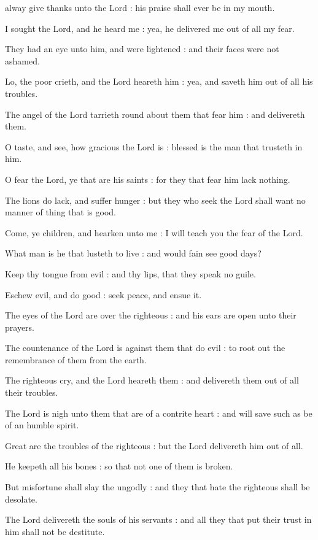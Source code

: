 
 alway give thanks unto the Lord : his praise shall ever be in my mouth.\par
{}
I sought the Lord, and he heard me : yea, he delivered me out of all my fear.\par
{}They had an eye unto him, and were lightened : and their faces were not ashamed.\par
{}Lo, the poor crieth, and the Lord heareth him : yea, and saveth him out of all his troubles.\par
{}The angel of the Lord tarrieth round about them that fear him : and delivereth them.\par
{}O taste, and see, how gracious the Lord is : blessed is the man that trusteth in him.\par
{}O fear the Lord, ye that are his saints : for they that fear him lack nothing.\par
{}The lions do lack, and suffer hunger : but they who seek the Lord shall want no manner of thing that is good.\par
{}Come, ye children, and hearken unto me : I will teach you the fear of the Lord.\par
{}What man is he that lusteth to live : and would fain see good days?\par
{}Keep thy tongue from evil : and thy lips, that they speak no guile.\par
{}Eschew evil, and do good : seek peace, and ensue it.\par
{}The eyes of the Lord are over the righteous : and his ears are open unto their prayers.\par
{}The countenance of the Lord is against them that do evil : to root out the remembrance of them from the earth.\par
{}The righteous cry, and the Lord heareth them : and delivereth them out of all their troubles.\par
{}The Lord is nigh unto them that are of a contrite heart : and will save such as be of an humble spirit.\par
{}Great are the troubles of the righteous : but the Lord delivereth him out of all.\par
{}He keepeth all his bones : so that not one of them is broken.\par
{}But misfortune shall slay the ungodly : and they that hate the righteous shall be desolate.\par
{}The Lord delivereth the souls of his servants : and all they that put their trust in him shall not be destitute.\par

